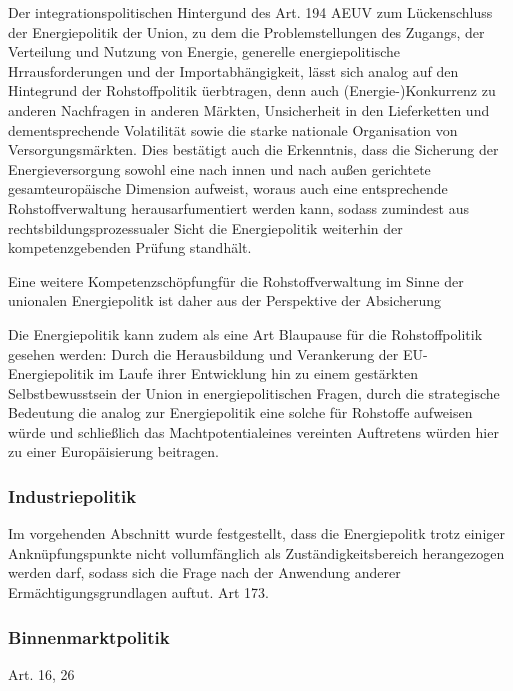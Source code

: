 \documentclass[12pt,a4paper,oneside]{book} %
\begin{document}
	Der integrationspolitischen Hintergund des Art. 194 AEUV zum Lückenschluss der Energiepolitik der Union, zu dem die Problemstellungen des Zugangs, der Verteilung und Nutzung von Energie, generelle energiepolitische Hrrausforderungen und der Importabhängigkeit,\autocite[Nettesheim, Art. 194 Rn 10]{grabitz_recht_2024} lässt sich analog auf den Hintegrund der Rohstoffpolitik üerbtragen, denn auch (Energie-)Konkurrenz zu anderen Nachfragen in anderen Märkten, Unsicherheit in den Lieferketten und dementsprechende Volatilität sowie die starke nationale Organisation von Versorgungsmärkten.\autocite[Nettesheim, Art. 194 Rn 10]{grabitz_recht_2024} Dies bestätigt auch die Erkenntnis, dass die Sicherung der Energieversorgung sowohl eine nach innen und nach außen gerichtete gesamteuropäische Dimension aufweist, woraus auch eine entsprechende Rohstoffverwaltung herausarfumentiert werden kann, sodass zumindest aus rechtsbildungsprozessualer Sicht die Energiepolitik weiterhin der kompetenzgebenden Prüfung standhält.
	
	Eine weitere \glqq Kompetenzschöpfung\grqq für die Rohstoffverwaltung im Sinne der unionalen Energiepolitk ist daher aus der Perspektive der Absicherung 
	
	Die Energiepolitik kann zudem als eine Art Blaupause für die Rohstoffpolitik gesehen werden: Durch die Herausbildung und Verankerung der EU-Energiepolitik im Laufe ihrer Entwicklung hin zu einem gestärkten Selbstbewusstsein der Union in energiepolitischen Fragen, durch die strategische Bedeutung die analog zur Energiepolitik eine solche für Rohstoffe aufweisen würde und schließlich das \glqq Machtpotential\grqq eines vereinten Auftretens würden hier zu einer Europäisierung beitragen.\autocite[Nettesheim, Art. 194 Rn 44]{grabitz_recht_2024}
	
	\subsubsection{Industriepolitik}
	Im vorgehenden Abschnitt wurde festgestellt, dass die Energiepolitk trotz einiger Anknüpfungspunkte nicht vollumfänglich als Zuständigkeitsbereich herangezogen werden darf, sodass sich die Frage nach der Anwendung anderer Ermächtigungsgrundlagen auftut.
	Art 173.
	
	\subsubsection{Binnenmarktpolitik}
	Art. 16, 26
	
\end{document}
